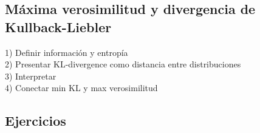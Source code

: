 




\subsection{Máxima verosimilitud y divergencia de Kullback-Liebler}

\begin{mdframed}[style=pendiente, frametitle={\center Discusión}]
1) Definir información y entropía\\
2) Presentar KL-divergence como distancia entre distribuciones\\
3) Interpretar \\
4) Conectar min KL y max verosimilitud
	
\end{mdframed}








\subsection{Ejercicios} %
\label{sub:ejercicios_regresion_lineal}


